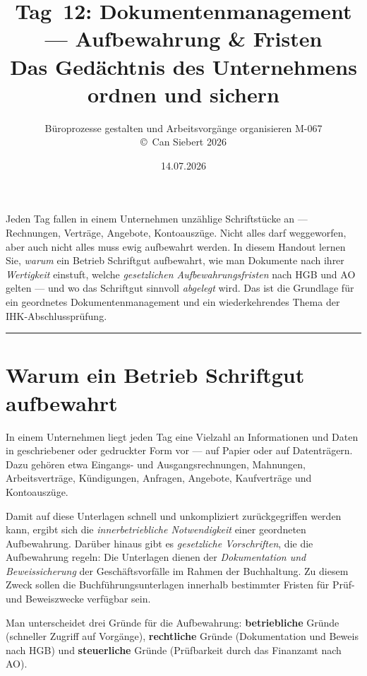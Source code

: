 \documentclass[11pt, a4paper]{article}
\title{\vspace*{-1.5cm}\Huge\bfseries\color{bfwPrimaryDark}Tag~12: Dokumentenmanagement --- Aufbewahrung \& Fristen\\[0.4em]
  \large\color{bfwInkSoft}\textnormal{Das Gedächtnis des Unternehmens ordnen und sichern}}
\author{\textsf{Büroprozesse gestalten und Arbeitsvorgänge organisieren \textperiodcentered{} M-067}\\
\textsf{\small\copyright\ Can Siebert\,\textperiodcentered\,2026}}
\date{14.07.2026}
\begin{document}
\maketitle
\thispagestyle{empty}

\vspace{1em}
\begin{merksatz}[title={\bfseries Worum geht es heute?}]
Jeden Tag fallen in einem Unternehmen unzählige Schriftstücke an --- Rechnungen,
Verträge, Angebote, Kontoauszüge. Nicht alles darf weggeworfen, aber auch nicht alles
muss ewig aufbewahrt werden. In diesem Handout lernen Sie, \emph{warum} ein Betrieb
Schriftgut aufbewahrt, wie man Dokumente nach ihrer \emph{Wertigkeit} einstuft, welche
\emph{gesetzlichen Aufbewahrungsfristen} nach HGB und AO gelten --- und wo das Schriftgut
sinnvoll \emph{abgelegt} wird. Das ist die Grundlage für ein geordnetes
Dokumentenmanagement und ein wiederkehrendes Thema der IHK-Abschlussprüfung.
\end{merksatz}

\tableofcontents
\vspace{1em}
\hrule
\vspace{1em}

\section{Warum ein Betrieb Schriftgut aufbewahrt}

In einem Unternehmen liegt jeden Tag eine Vielzahl an Informationen und Daten in
geschriebener oder gedruckter Form vor --- auf Papier oder auf Datenträgern. Dazu
gehören etwa Eingangs- und Ausgangsrechnungen, Mahnungen, Arbeitsverträge,
Kündigungen, Anfragen, Angebote, Kaufverträge und Kontoauszüge.

Damit auf diese Unterlagen schnell und unkompliziert zurückgegriffen werden kann,
ergibt sich die \emph{innerbetriebliche Notwendigkeit} einer geordneten Aufbewahrung.
Darüber hinaus gibt es \emph{gesetzliche Vorschriften}, die die Aufbewahrung regeln: Die
Unterlagen dienen der \emph{Dokumentation und Beweissicherung} der Geschäftsvorfälle im
Rahmen der Buchhaltung. Zu diesem Zweck sollen die Buchführungsunterlagen innerhalb
bestimmter Fristen für Prüf- und Beweiszwecke verfügbar sein.

\begin{merksatz}
Man unterscheidet drei Gründe für die Aufbewahrung: \textbf{betriebliche} Gründe (schneller
Zugriff auf Vorgänge), \textbf{rechtliche} Gründe (Dokumentation und Beweis nach HGB) und
\textbf{steuerliche} Gründe (Prüfbarkeit durch das Finanzamt nach AO).
\end{merksatz}
\end{document}
